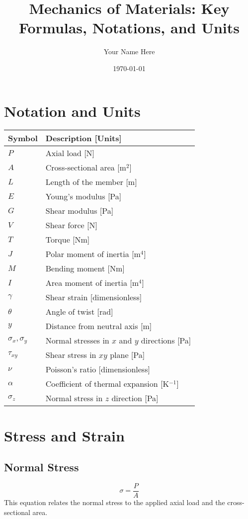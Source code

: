 \documentclass[12pt]{article}
\title{Mechanics of Materials: Key Formulas, Notations, and Units}
\author{Your Name Here}
\date{\today}
\begin{document}
\maketitle

\tableofcontents

\section{Notation and Units}
\begin{tabular}{ll}
    \toprule
    Symbol & Description [Units] \\
    \midrule
    $P$ & Axial load [N] \\
    $A$ & Cross-sectional area [m$^2$] \\
    $L$ & Length of the member [m] \\
    $E$ & Young's modulus [Pa] \\
    $G$ & Shear modulus [Pa] \\
    $V$ & Shear force [N] \\
    $T$ & Torque [Nm] \\
    $J$ & Polar moment of inertia [m$^4$] \\
    $M$ & Bending moment [Nm] \\
    $I$ & Area moment of inertia [m$^4$] \\
    $\gamma$ & Shear strain [dimensionless] \\
    $\theta$ & Angle of twist [rad] \\
    $y$ & Distance from neutral axis [m] \\
    $\sigma_x, \sigma_y$ & Normal stresses in $x$ and $y$ directions [Pa] \\
    $\tau_{xy}$ & Shear stress in $xy$ plane [Pa] \\
    $\nu$ & Poisson's ratio [dimensionless] \\
    $\alpha$ & Coefficient of thermal expansion [K$^{-1}$] \\
    $\sigma_z$ & Normal stress in $z$ direction [Pa] \\
    \bottomrule
\end{tabular}

\section{Stress and Strain}
\subsection{Normal Stress}
\begin{equation}
\sigma = \frac{P}{A}
\end{equation}
This equation relates the normal stress to the applied axial load and the cross-sectional area.
\end{document}
